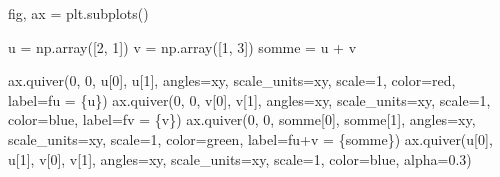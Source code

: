 \documentclass[
  french,
  11pt,
  a4paper,
]{scrbook}
\newenvironment{Shaded}{}{}
\newcommand{\DecValTok}[1]{\textcolor[rgb]{0.00,0.36,0.77}{#1}}
\newcommand{\FloatTok}[1]{\textcolor[rgb]{0.00,0.36,0.77}{#1}}
\newcommand{\NormalTok}[1]{\textcolor[rgb]{0.14,0.16,0.18}{#1}}
\newcommand{\OperatorTok}[1]{\textcolor[rgb]{0.14,0.16,0.18}{#1}}
\newcommand{\SpecialCharTok}[1]{\textcolor[rgb]{0.00,0.36,0.77}{#1}}
\newcommand{\SpecialStringTok}[1]{\textcolor[rgb]{0.01,0.18,0.38}{#1}}
\newcommand{\StringTok}[1]{\textcolor[rgb]{0.01,0.18,0.38}{#1}}
\begin{document}
\begin{Shaded}
\begin{Highlighting}[]
\NormalTok{fig, ax }\OperatorTok{=}\NormalTok{ plt.subplots()}

\NormalTok{u }\OperatorTok{=}\NormalTok{ np.array([}\DecValTok{2}\NormalTok{, }\DecValTok{1}\NormalTok{])}
\NormalTok{v }\OperatorTok{=}\NormalTok{ np.array([}\DecValTok{1}\NormalTok{, }\DecValTok{3}\NormalTok{])}
\NormalTok{somme }\OperatorTok{=}\NormalTok{ u }\OperatorTok{+}\NormalTok{ v}

\NormalTok{ax.quiver(}\DecValTok{0}\NormalTok{, }\DecValTok{0}\NormalTok{, u[}\DecValTok{0}\NormalTok{], u[}\DecValTok{1}\NormalTok{], angles}\OperatorTok{=}\StringTok{\textquotesingle{}xy\textquotesingle{}}\NormalTok{, scale\_units}\OperatorTok{=}\StringTok{\textquotesingle{}xy\textquotesingle{}}\NormalTok{, scale}\OperatorTok{=}\DecValTok{1}\NormalTok{, }
\NormalTok{          color}\OperatorTok{=}\StringTok{\textquotesingle{}red\textquotesingle{}}\NormalTok{, label}\OperatorTok{=}\SpecialStringTok{f\textquotesingle{}u = }\SpecialCharTok{\{}\NormalTok{u}\SpecialCharTok{\}}\SpecialStringTok{\textquotesingle{}}\NormalTok{)}
\NormalTok{ax.quiver(}\DecValTok{0}\NormalTok{, }\DecValTok{0}\NormalTok{, v[}\DecValTok{0}\NormalTok{], v[}\DecValTok{1}\NormalTok{], angles}\OperatorTok{=}\StringTok{\textquotesingle{}xy\textquotesingle{}}\NormalTok{, scale\_units}\OperatorTok{=}\StringTok{\textquotesingle{}xy\textquotesingle{}}\NormalTok{, scale}\OperatorTok{=}\DecValTok{1}\NormalTok{, }
\NormalTok{          color}\OperatorTok{=}\StringTok{\textquotesingle{}blue\textquotesingle{}}\NormalTok{, label}\OperatorTok{=}\SpecialStringTok{f\textquotesingle{}v = }\SpecialCharTok{\{}\NormalTok{v}\SpecialCharTok{\}}\SpecialStringTok{\textquotesingle{}}\NormalTok{)}
\NormalTok{ax.quiver(}\DecValTok{0}\NormalTok{, }\DecValTok{0}\NormalTok{, somme[}\DecValTok{0}\NormalTok{], somme[}\DecValTok{1}\NormalTok{], angles}\OperatorTok{=}\StringTok{\textquotesingle{}xy\textquotesingle{}}\NormalTok{, scale\_units}\OperatorTok{=}\StringTok{\textquotesingle{}xy\textquotesingle{}}\NormalTok{, scale}\OperatorTok{=}\DecValTok{1}\NormalTok{, }
\NormalTok{          color}\OperatorTok{=}\StringTok{\textquotesingle{}green\textquotesingle{}}\NormalTok{, label}\OperatorTok{=}\SpecialStringTok{f\textquotesingle{}u+v = }\SpecialCharTok{\{}\NormalTok{somme}\SpecialCharTok{\}}\SpecialStringTok{\textquotesingle{}}\NormalTok{)}
\NormalTok{ax.quiver(u[}\DecValTok{0}\NormalTok{], u[}\DecValTok{1}\NormalTok{], v[}\DecValTok{0}\NormalTok{], v[}\DecValTok{1}\NormalTok{], angles}\OperatorTok{=}\StringTok{\textquotesingle{}xy\textquotesingle{}}\NormalTok{, scale\_units}\OperatorTok{=}\StringTok{\textquotesingle{}xy\textquotesingle{}}\NormalTok{, scale}\OperatorTok{=}\DecValTok{1}\NormalTok{, }
\NormalTok{          color}\OperatorTok{=}\StringTok{\textquotesingle{}blue\textquotesingle{}}\NormalTok{, alpha}\OperatorTok{=}\FloatTok{0.3}\NormalTok{)}


\end{Highlighting}
\end{Shaded}
\end{document}
